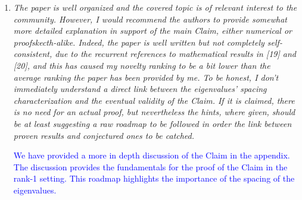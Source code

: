 \documentclass[11pt]{article}
\begin{document}
\begin{enumerate}

\item \textit{The paper is well organized and the covered topic is of relevant interest to
    the community. However, I would recommend the authors to provide somewhat more
    detailed explanation in support of the main Claim, either numerical or
    proofskecth-alike. Indeed, the paper is well written but not completely
    self-consistent, due to the recurrent references to mathematical results in [19] and
    [20], and this has caused my novelty ranking to be a bit lower than the average
    ranking the paper has been provided by me. To be honest, I don't immediately
    understand a direct link between the eigenvalues' spacing characterization and the
    eventual validity of the Claim. If it is claimed, there is no need for an actual
    proof, but nevertheless the hints, where given, should be at least suggesting a raw
    roadmap to be followed in order the link between proven results and conjectured ones
    to be catched. }

\textcolor{blue}{We have provided a more in depth discussion of the Claim in the
  appendix. The discussion provides the fundamentals for the proof of the Claim in the
  rank-1 setting. This roadmap highlights the importance of the spacing of the
  eigenvalues. }

\end{enumerate}
\end{document}
